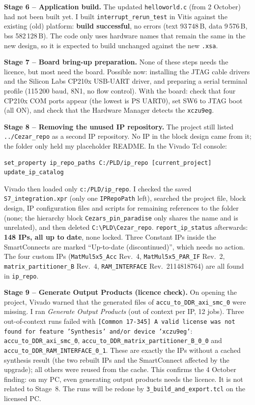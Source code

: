 \documentclass[11pt,a4paper]{article}
\newcommand{\code}[1]{\texttt{#1}}
\begin{document}
\textbf{Stage 6 -- Application build.} The updated \code{helloworld.c} (from 2 October) had not been built yet. I built \code{interrupt\_rerun\_test} in Vitis against the existing (old) platform: \textbf{build successful}, no errors (text 93\,748\,B, data 9\,576\,B, bss 582\,128\,B). The code only uses hardware names that remain the same in the new design, so it is expected to build unchanged against the new \code{.xsa}.

\textbf{Stage 7 -- Board bring-up preparation.} None of these steps needs the licence, but most need the board. Possible now: installing the JTAG cable drivers and the Silicon Labs CP210x USB-UART driver, and preparing a serial terminal profile (115\,200 baud, 8N1, no flow control). With the board: check that four CP210x COM ports appear (the lowest is PS UART0), set SW6 to JTAG boot (all ON), and check that the Hardware Manager detects the \code{xczu9eg}.

\textbf{Stage 8 -- Removing the unused IP repository.} The project still listed \code{../Cezar\_repo} as a second IP repository. No IP in the block design came from it; the folder only held my placeholder README. In the Vivado Tcl console:
\begin{lstlisting}
set_property ip_repo_paths C:/PLD/ip_repo [current_project]
update_ip_catalog
\end{lstlisting}
Vivado then loaded only \code{c:/PLD/ip\_repo}. I checked the saved \code{S7\_integration.xpr} (only one \code{IPRepoPath} left), searched the project file, block design, IP configuration files and scripts for remaining references to the folder (none; the hierarchy block \code{Cezars\_pin\_paradise} only shares the name and is unrelated), and then deleted \code{C:\textbackslash PLD\textbackslash Cezar\_repo}. \code{report\_ip\_status} afterwards: \textbf{148 IPs, all up to date}, none locked. Three Constant IPs inside the SmartConnects are marked ``Up-to-date (discontinued)'', which needs no action. The four custom IPs (\code{MatMul5x5\_Acc} Rev.~4, \code{MatMul5x5\_PAR\_IF} Rev.~2, \code{matrix\_partitioner\_B} Rev.~4, \code{RAM\_INTERFACE} Rev.~2114818764) are all found in \code{ip\_repo}.

\textbf{Stage 9 -- Generate Output Products (licence check).} On opening the project, Vivado warned that the generated files of \code{accu\_to\_DDR\_axi\_smc\_0} were missing. I ran \emph{Generate Output Products} (out of context per IP, 12 jobs). Three out-of-context runs failed with \code{[Common 17-345] A valid license was not found for feature 'Synthesis' and/or device 'xczu9eg'}: \code{accu\_to\_DDR\_axi\_smc\_0}, \code{accu\_to\_DDR\_matrix\_partitioner\_B\_0\_0} and \code{accu\_to\_DDR\_RAM\_INTERFACE\_0\_1}. These are exactly the IPs without a cached synthesis result (the two rebuilt IPs and the SmartConnect affected by the upgrade); all others were reused from the cache. This confirms the 4 October finding: on my PC, even generating output products needs the licence. It is not related to Stage~8. The runs will be redone by \code{3\_build\_and\_export.tcl} on the licensed PC.
\end{document}
